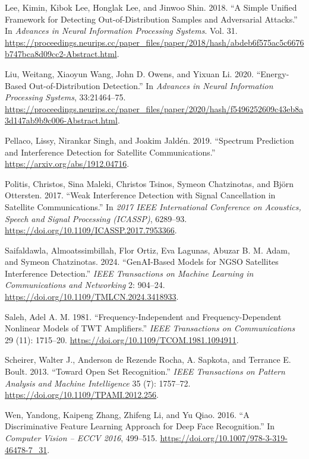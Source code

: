 \documentclass[
  10pt,
]{article}
\newlength{\cslhangindent}
\newenvironment{CSLReferences}[2] %
 {\begin{list}{}{%
  \setlength{\itemindent}{0pt}
  \setlength{\leftmargin}{0pt}
  \setlength{\parsep}{0pt}
  \ifodd #1
   \setlength{\leftmargin}{\cslhangindent}
   \setlength{\itemindent}{-1\cslhangindent}
  \fi
  \setlength{\itemsep}{#2\baselineskip}}}
 {\end{list}}
\begin{document}
\begin{CSLReferences}{1}{0}
Lee, Kimin, Kibok Lee, Honglak Lee, and Jinwoo Shin. 2018. {``A Simple
Unified Framework for Detecting Out-of-Distribution Samples and
Adversarial Attacks.''} In \emph{Advances in Neural Information
Processing Systems}. Vol. 31.
\url{https://proceedings.neurips.cc/paper_files/paper/2018/hash/abdeb6f575ac5c6676b747bca8d09cc2-Abstract.html}.

Liu, Weitang, Xiaoyun Wang, John D. Owens, and Yixuan Li. 2020.
{``Energy-Based Out-of-Distribution Detection.''} In \emph{Advances in
Neural Information Processing Systems}, 33:21464--75.
\url{https://proceedings.neurips.cc/paper_files/paper/2020/hash/f5496252609c43eb8a3d147ab9b9c006-Abstract.html}.

Pellaco, Lissy, Nirankar Singh, and Joakim Jaldén. 2019. {``Spectrum
Prediction and Interference Detection for Satellite Communications.''}
\url{https://arxiv.org/abs/1912.04716}.

Politis, Christos, Sina Maleki, Christos Tsinos, Symeon Chatzinotas, and
Björn Ottersten. 2017. {``Weak Interference Detection with Signal
Cancellation in Satellite Communications.''} In \emph{2017 IEEE
International Conference on Acoustics, Speech and Signal Processing
(ICASSP)}, 6289--93. \url{https://doi.org/10.1109/ICASSP.2017.7953366}.

Saifaldawla, Almoatssimbillah, Flor Ortiz, Eva Lagunas, Abuzar B. M.
Adam, and Symeon Chatzinotas. 2024. {``{GenAI}-Based Models for {NGSO}
Satellites Interference Detection.''} \emph{IEEE Transactions on Machine
Learning in Communications and Networking} 2: 904--24.
\url{https://doi.org/10.1109/TMLCN.2024.3418933}.

Saleh, Adel A. M. 1981. {``Frequency-Independent and Frequency-Dependent
Nonlinear Models of {TWT} Amplifiers.''} \emph{IEEE Transactions on
Communications} 29 (11): 1715--20.
\url{https://doi.org/10.1109/TCOM.1981.1094911}.

Scheirer, Walter J., Anderson de Rezende Rocha, A. Sapkota, and Terrance
E. Boult. 2013. {``Toward Open Set Recognition.''} \emph{IEEE
Transactions on Pattern Analysis and Machine Intelligence} 35 (7):
1757--72. \url{https://doi.org/10.1109/TPAMI.2012.256}.

Wen, Yandong, Kaipeng Zhang, Zhifeng Li, and Yu Qiao. 2016. {``A
Discriminative Feature Learning Approach for Deep Face Recognition.''}
In \emph{Computer Vision -- ECCV 2016}, 499--515.
\url{https://doi.org/10.1007/978-3-319-46478-7_31}.

\end{CSLReferences}
\end{document}
